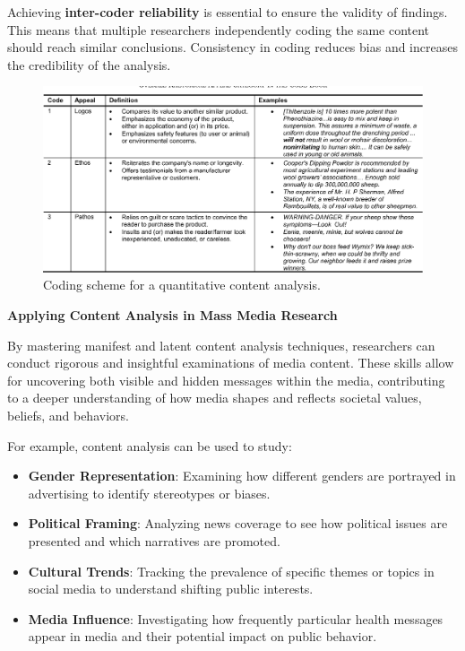 \documentclass[
]{book}
\providecommand{\tightlist}{%
  \setlength{\itemsep}{0pt}\setlength{\parskip}{0pt}}
\begin{document}
Achieving \textbf{inter-coder reliability} is essential to ensure the validity of findings. This means that multiple researchers independently coding the same content should reach similar conclusions. Consistency in coding reduces bias and increases the credibility of the analysis.

\begin{figure}
\centering
\includegraphics[width=1\linewidth,height=\textheight,keepaspectratio]{images/quant-content-scheme.png}
\caption{Coding scheme for a quantitative content analysis.}
\end{figure}

\textbf{Applying Content Analysis in Mass Media Research}

By mastering manifest and latent content analysis techniques, researchers can conduct rigorous and insightful examinations of media content. These skills allow for uncovering both visible and hidden messages within the media, contributing to a deeper understanding of how media shapes and reflects societal values, beliefs, and behaviors.

For example, content analysis can be used to study:

\begin{itemize}
\tightlist
\item
  \textbf{Gender Representation}: Examining how different genders are portrayed in advertising to identify stereotypes or biases.
\item
  \textbf{Political Framing}: Analyzing news coverage to see how political issues are presented and which narratives are promoted.
\item
  \textbf{Cultural Trends}: Tracking the prevalence of specific themes or topics in social media to understand shifting public interests.
\item
  \textbf{Media Influence}: Investigating how frequently particular health messages appear in media and their potential impact on public behavior.
\end{itemize}
\end{document}
